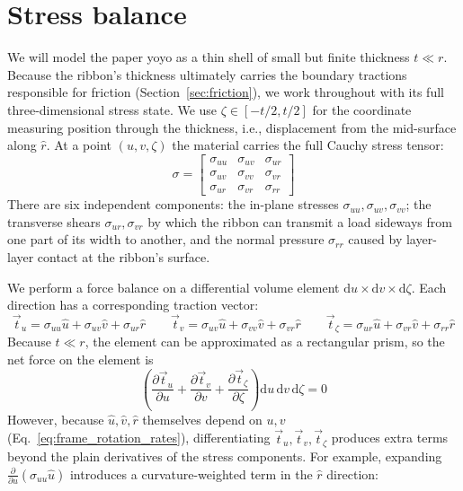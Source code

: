 \documentclass[11pt]{article}
\begin{document}
\section{Stress balance}\label{sec:equilibrium}
We will model the paper yoyo as a thin shell of small but finite thickness $t\ll r$. Because the ribbon's thickness ultimately carries the boundary tractions responsible for friction (Section~\ref{sec:friction}), we work throughout with its full three-dimensional stress state. We use $\zeta\in[-t/2,t/2]$ for the coordinate measuring position through the thickness, i.e., displacement from the mid-surface along $\hat r$. At a point $(u,v,\zeta)$ the material carries the full Cauchy stress tensor:
\begin{equation}
    \sigma = \begin{bmatrix}\sigma_{uu}&\sigma_{uv}&\sigma_{ur}\\ \sigma_{uv}&\sigma_{vv}&\sigma_{vr}\\ \sigma_{ur}&\sigma_{vr}&\sigma_{rr}\end{bmatrix}
\end{equation}
There are six independent components: the in-plane stresses $\sigma_{uu},\sigma_{uv},\sigma_{vv}$; the transverse shears $\sigma_{ur},\sigma_{vr}$ by which the ribbon can transmit a load sideways from one part of its width to another, and the normal pressure $\sigma_{rr}$ caused by layer-layer contact at the ribbon's surface. 

We perform a force balance on a differential volume element $\mathrm du\times\mathrm dv\times\mathrm d\zeta$. Each direction has a corresponding traction vector:
\begin{equation}
\vec t_u=\sigma_{uu}\hat u+\sigma_{uv}\hat v+\sigma_{ur}\hat r \qquad
\vec t_v=\sigma_{uv}\hat u+\sigma_{vv}\hat v+\sigma_{vr}\hat r \qquad
\vec t_\zeta=\sigma_{ur}\hat u+\sigma_{vr}\hat v+\sigma_{rr}\hat r
\end{equation}
Because $t\ll r$, the element can be approximated as a rectangular prism, so the net force on the element is
\begin{equation}
    \left(\frac{\partial\vec t_u}{\partial u}+\frac{\partial\vec t_v}{\partial v}+\frac{\partial\vec t_\zeta}{\partial\zeta}\right)\mathrm du\,\mathrm dv\,\mathrm d\zeta 
    =0
\end{equation}
However, because $\hat u,\hat v,\hat r$ themselves depend on $u,v$ (Eq.~\ref{eq:frame_rotation_rates}), differentiating $\vec t_u,\vec t_v,\vec t_\zeta$ produces extra terms beyond the plain derivatives of the stress components. For example, expanding $\frac{\partial}{\partial u}( \sigma_{uu} \hat u)$ introduces a curvature-weighted term in the $\hat r$ direction:
\end{document}
